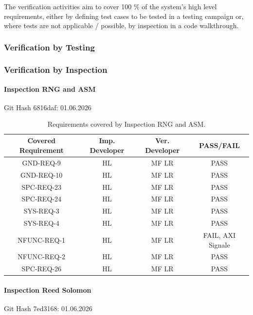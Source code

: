The verification activities aim to cover 100 \% of the system's high level requirements, either by defining test cases to be tested in a testing campaign or, where tests are not applicable / possible, by inspection in a code walkthrough.


\subsubsection{Verification by Testing}



\subsubsection{Verification by Inspection}

\paragraph{Inspection RNG and ASM} Git Hash 6816daf: 01.06.2026
\begin{table}[h!]
	\begin{tabular}{|c|c|c|c|}
		\hline
		\textbf{Covered Requirement} & \textbf{Imp. Developer} & \textbf{Ver. Developer} & \textbf{PASS/FAIL}\\
		\hline
		GND-REQ-9 & HL & MF LR & PASS \\
		\hline
		GND-REQ-10 & HL & MF LR & PASS \\
		\hline
		SPC-REQ-23 & HL & MF LR & PASS \\
		\hline
		SPC-REQ-24 & HL & MF LR & PASS \\
		\hline
		SYS-REQ-3 & HL & MF LR & PASS \\
		\hline
		SYS-REQ-4 & HL & MF LR & PASS \\
		\hline
		NFUNC-REQ-1 & HL & MF LR & FAIL, AXI Signale \\
		\hline
		NFUNC-REQ-2 & HL & MF LR & PASS \\
		\hline
		SPC-REQ-26 & HL & MF LR & PASS \\
		\hline
	\end{tabular}
	\caption{Requirements covered by Inspection RNG and ASM.}
	\label{tab:inspec_RNG_ASM}
\end{table}


\paragraph{Inspection Reed Solomon} Git Hash 7ed3168: 01.06.2026

